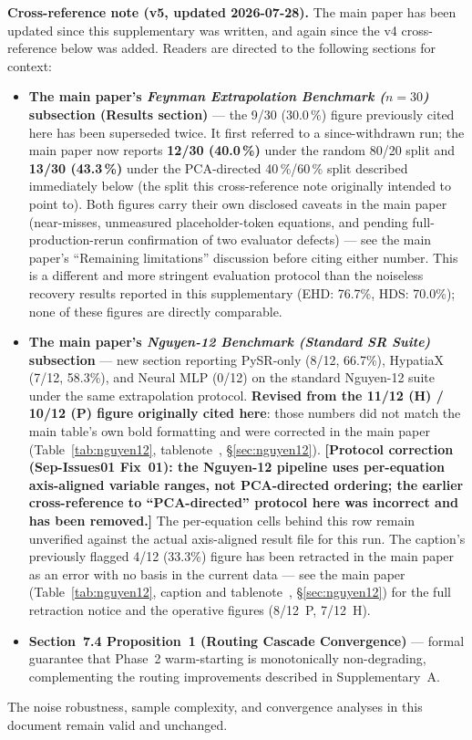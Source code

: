 \documentclass[twoside,11pt]{article}
\begin{document}
\medskip
\noindent\textbf{Cross-reference note (v5, updated 2026-07-28).}
The main paper has been updated since this supplementary was written, and
again since the v4 cross-reference below was added. Readers are directed
to the following sections for context:
\begin{itemize}
  \item \textbf{The main paper's \emph{Feynman Extrapolation Benchmark ($n=30$)} subsection (Results section)} --- the
    9/30 (30.0\,\%) figure previously cited here has been superseded twice.
    It first referred to a since-withdrawn run; the main paper now reports
    \textbf{12/30 (40.0\,\%)} under the random 80/20 split and
    \textbf{13/30 (43.3\,\%)} under the PCA-directed 40\,\%/60\,\% split
    described immediately below (the split this cross-reference note
    originally intended to point to). Both figures carry their own
    disclosed caveats in the main paper (near-misses, unmeasured
    placeholder-token equations, and pending full-production-rerun
    confirmation of two evaluator defects) --- see the main paper's
    ``Remaining limitations'' discussion before citing either number.
    This is a different and more stringent evaluation protocol
    than the noiseless recovery results reported in this supplementary
    (EHD: 76.7\%, HDS: 70.0\%); none of these figures are directly comparable.
  \item \textbf{The main paper's \emph{Nguyen-12 Benchmark (Standard SR Suite)} subsection} --- new section reporting
    PySR-only (8/12, 66.7\%), HypatiaX (7/12, 58.3\%), and Neural MLP
    (0/12) on the standard Nguyen-12 suite under the same extrapolation
    protocol. \textbf{Revised from the 11/12 (H) / 10/12 (P) figure
    originally cited here}: those numbers did not match the main
    table's own bold formatting and were corrected in the main paper
    (Table~\ref{tab:nguyen12}, tablenote~\ddag, \S\ref{sec:nguyen12}).
    \textbf{[Protocol correction (Sep-Issues01 Fix~01): the Nguyen-12
    pipeline uses per-equation axis-aligned variable ranges, not
    PCA-directed ordering; the earlier cross-reference to
    ``PCA-directed'' protocol here was incorrect and has been removed.]}
    The per-equation cells behind this row remain unverified against
    the actual axis-aligned result file for this run. The caption's
    previously flagged 4/12 (33.3\%) figure has been retracted in
    the main paper as an error with no basis in the current data ---
    see the main paper (Table~\ref{tab:nguyen12}, caption and
    tablenote~\ddag, \S\ref{sec:nguyen12}) for the full retraction
    notice and the operative figures (8/12~P, 7/12~H).
  \item \textbf{Section~7.4 Proposition~1 (Routing Cascade Convergence)} --- formal
    guarantee that Phase~2 warm-starting is monotonically non-degrading,
    complementing the routing improvements described in Supplementary~A.
\end{itemize}
The noise robustness, sample complexity, and convergence analyses in this
document remain valid and unchanged.
\end{document}
